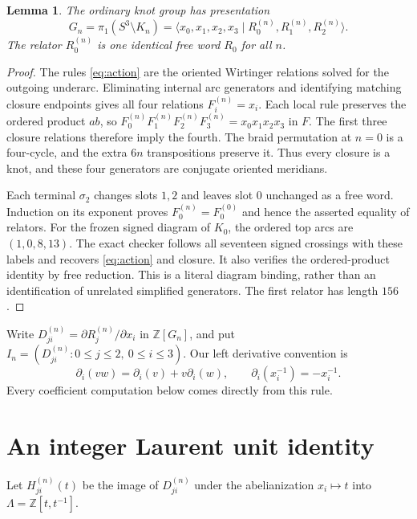 \documentclass[11pt]{article}
\newtheorem{lemma}[theorem]{Lemma}
\newcommand{\Z}{\mathbb Z}
\begin{document}
\begin{lemma}\label{lem:presentation}
The ordinary knot group has presentation
\[
 G_n=\pi_1(S^3\setminus K_n)
   =\langle x_0,x_1,x_2,x_3\mid R_0^{(n)},R_1^{(n)},R_2^{(n)}\rangle.
\]
The relator $R_0^{(n)}$ is one identical free word $R_0$ for all $n$.
\end{lemma}
\begin{proof}
The rules \eqref{eq:action} are the oriented Wirtinger relations
solved for the outgoing underarc. Eliminating internal arc generators
and identifying matching closure endpoints gives all four relations
$F_i^{(n)}=x_i$. Each local rule preserves the ordered product $ab$,
so $F_0^{(n)}F_1^{(n)}F_2^{(n)}F_3^{(n)}=x_0x_1x_2x_3$ in $F$.
The first three closure relations therefore imply the fourth.
The braid permutation at $n=0$ is a four-cycle, and the extra $6n$
transpositions preserve it. Thus every closure is a knot, and these
four generators are conjugate oriented meridians.

Each terminal $\sigma_2$ changes slots $1,2$ and leaves slot $0$
unchanged as a free word. Induction on its exponent proves
$F_0^{(n)}=F_0^{(0)}$ and hence the asserted equality of relators.
For the frozen signed diagram of $K_0$, the ordered top arcs are
$(1,0,8,13)$. The exact checker follows all seventeen signed crossings
with these labels and recovers \eqref{eq:action} and closure.
It also verifies the ordered-product identity by free reduction.
This is a literal diagram binding, rather than an identification of
unrelated simplified generators. The first relator has length $156$.
\end{proof}

Write $D_{ji}^{(n)}=\partial R_j^{(n)}/\partial x_i$ in $\Z[G_n]$,
and put $I_n=(D_{ji}^{(n)}:0\le j\le2,\ 0\le i\le3)$.
Our left derivative convention is
\[
 \partial_i(vw)=\partial_i(v)+v\partial_i(w),\qquad
 \partial_i(x_i^{-1})=-x_i^{-1}.
\]
Every coefficient computation below comes directly from this rule.

\section{An integer Laurent unit identity}
Let $H_{ji}^{(n)}(t)$ be the image of $D_{ji}^{(n)}$ under the
abelianization $x_i\mapsto t$ into $\Lambda=\Z[t,t^{-1}]$.
\end{document}
